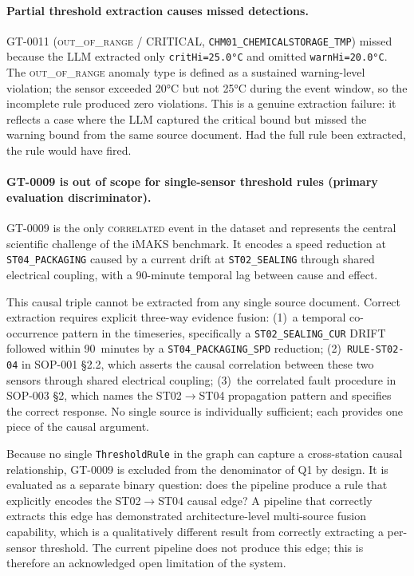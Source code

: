 ﻿\documentclass[11pt]{article}
\begin{document}
\paragraph{Partial threshold extraction causes missed detections.}
GT-0011 (\textsc{out\_of\_range} / CRITICAL, \texttt{CHM01\_CHEMICALSTORAGE\_TMP})
missed because the LLM extracted only \texttt{critHi=25.0°C} and omitted
\texttt{warnHi=20.0°C}.
The \textsc{out\_of\_range} anomaly type is defined as a sustained
warning-level violation; the sensor exceeded 20°C but not 25°C during the
event window, so the incomplete rule produced zero violations.
This is a genuine extraction failure: it reflects a case where the LLM
captured the critical bound but missed the warning bound from the same source
document.
Had the full rule been extracted, the rule would have fired.

\paragraph{GT-0009 is out of scope for single-sensor threshold rules
(primary evaluation discriminator).}
GT-0009 is the only \textsc{correlated} event in the dataset and represents
the central scientific challenge of the iMAKS benchmark.
It encodes a speed reduction at \texttt{ST04\_PACKAGING} caused by a current
drift at \texttt{ST02\_SEALING} through shared electrical coupling, with a
90-minute temporal lag between cause and effect.

This causal triple cannot be extracted from any single source document.
Correct extraction requires explicit three-way evidence fusion:
(1)~a temporal co-occurrence pattern in the timeseries, specifically a
\texttt{ST02\_SEALING\_CUR} DRIFT followed within 90~minutes by a
\texttt{ST04\_PACKAGING\_SPD} reduction;
(2)~\texttt{RULE-ST02-04} in SOP-001 \S2.2, which asserts the causal
correlation between these two sensors through shared electrical coupling;
(3)~the correlated fault procedure in SOP-003 \S2, which names the
ST02$\to$ST04 propagation pattern and specifies the correct response.
No single source is individually sufficient; each provides one piece of
the causal argument.

Because no single \texttt{ThresholdRule} in the graph can capture a
cross-station causal relationship, GT-0009 is excluded from the
denominator of Q1 by design.
It is evaluated as a separate binary question: does the pipeline produce
a rule that explicitly encodes the ST02$\to$ST04 causal edge?
A pipeline that correctly extracts this edge has demonstrated
architecture-level multi-source fusion capability, which is a qualitatively
different result from correctly extracting a per-sensor threshold.
The current pipeline does not produce this edge; this is therefore an
acknowledged open limitation of the system.
\end{document}
